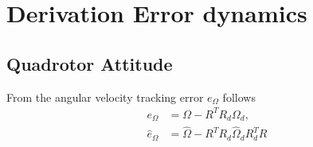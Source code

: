
\section{Derivation Error dynamics}\label{sec:app.error}
\subsection{Quadrotor Attitude}
From the angular velocity tracking error $ e_\Omega $ follows
\begin{equation}\label{eq:app.eOmega}
\begin{aligned}
e_\Omega&=\Omega-R^TR_d\Omega_d,\\
\hat{e}_\Omega&=\hat{\Omega}-R^TR_d\hat{\Omega}_dR_d^TR
\end{aligned}
\end{equation}

